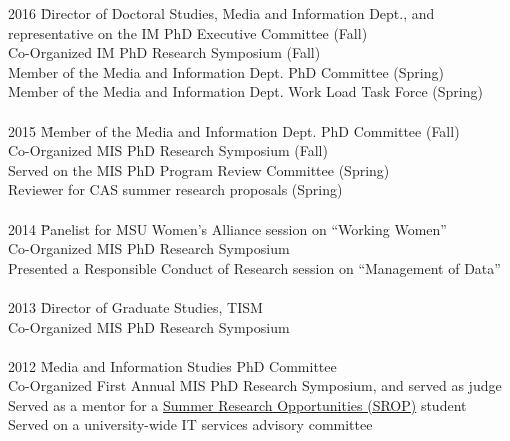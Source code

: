\documentclass[9pt]{extarticle}
\begin{document}
\begin{tabbing}
2016 \hspace{0.3in}\= Director of Doctoral Studies, Media and Information Dept., and \\
\> \hspace{0.5cm} representative on the IM PhD Executive Committee (Fall) \\
\> Co-Organized IM PhD Research Symposium (Fall) \\ %
\> Member of the Media and Information Dept. PhD Committee (Spring) \\ 
\> Member of the Media and Information Dept. Work Load Task Force (Spring) \\\\

2015 \hspace{0.3in}\= Member of the Media and Information Dept. PhD Committee (Fall) \\ %
\> Co-Organized MIS PhD Research Symposium (Fall) \\ %
\> Served on the MIS PhD Program Review Committee (Spring) \\ %
\> Reviewer for CAS summer research proposals (Spring) \\\\ %

2014 \hspace{0.3in}\=  Panelist for MSU Women's Alliance session on ``Working Women'' \\ %
\> Co-Organized MIS PhD Research Symposium \\ %
\> Presented a Responsible Conduct of Research session on ``Management of Data'' \\\\ %

2013 \hspace{0.3in}\=  Director of Graduate Studies, TISM \\
\> Co-Organized MIS PhD Research Symposium \\\\ 

2012 \hspace{0.3in}\=  Media and Information Studies PhD Committee \\
\> Co-Organized First Annual MIS PhD Research Symposium, and served as judge \\ %
\> Served as a mentor for a \href{https://grad.msu.edu/srop}{Summer Research Opportunities (SROP)} student \\ %
\> Served on a university-wide IT services advisory committee \\ %
\end{tabbing}
\end{document}
